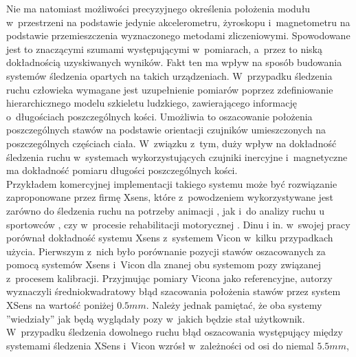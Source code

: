 Nie ma natomiast możliwości precyzyjnego określenia położenia modułu w~przestrzeni na podstawie jedynie akcelerometru, żyroskopu i~magnetometru na podstawie przemieszczenia wyznaczonego metodami zliczeniowymi. Spowodowane jest to znaczącymi szumami występującymi w~pomiarach, a~przez to niską dokładnością uzyskiwanych wyników. Fakt ten ma wpływ na sposób budowania systemów śledzenia opartych na takich urządzeniach. W~przypadku śledzenia ruchu człowieka wymagane jest uzupełnienie pomiarów poprzez zdefiniowanie hierarchicznego modelu szkieletu ludzkiego, zawierającego informację o~długościach poszczególnych kości. Umożliwia to oszacowanie położenia poszczególnych stawów na podstawie orientacji czujników umieszczonych na poszczególnych częściach ciała. W~związku z~tym, duży wpływ na dokładność śledzenia ruchu w~systemach wykorzystujących czujniki inercyjne i~magnetyczne ma dokładność pomiaru długości poszczególnych kości.\\
Przykładem komercyjnej implementacji takiego systemu może być rozwiązanie zaproponowane przez firmę Xsens, które z~powodzeniem wykorzystywane jest zarówno do śledzenia ruchu na potrzeby animacji , jak i~do analizy ruchu u sportowców , czy w~procesie rehabilitacji motorycznej . Dinu i in. w~swojej pracy \cite{Dinu2016} porównał dokładność systemu Xsens z~systemem Vicon w~kilku przypadkach użycia. Pierwszym z~nich było porównanie pozycji stawów oszacowanych za pomocą systemów Xsens i~Vicon dla znanej obu systemom pozy związanej z~procesem kalibracji. Przyjmując pomiary Vicona jako referencyjne, autorzy wyznaczyli średniokwadratowy błąd szacowania położenia stawów przez system XSens na wartość poniżej $0.5mm$. Należy jednak pamiętać, że oba systemy ''wiedziały'' jak będą wyglądały pozy w~jakich będzie stał użytkownik. W~przypadku śledzenia dowolnego ruchu błąd oszacowania występujący między systemami śledzenia XSens i~Vicon wzrósł w~zależności od osi do niemal $5.5mm$,
					
